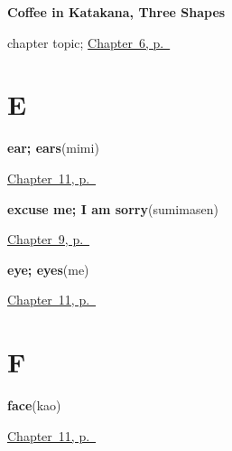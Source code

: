 \noindent\begin{minipage}[t]{\linewidth}
\raggedright
\textbf{Coffee in Katakana, Three Shapes}\par
\footnotesize chapter topic; \hyperref[ch:ja-koohii-katakana]{Chapter~6, p.~\pageref*{ch:ja-koohii-katakana}}
\end{minipage}\par\smallskip

\section*{E}

\noindent\begin{minipage}[t]{\linewidth}
\raggedright
\textbf{ear; ears}\enspace\emph{}\enspace(mimi)\par
\footnotesize \hyperref[ch:ja-body-seven]{Chapter~11, p.~\pageref*{ch:ja-body-seven}}
\end{minipage}\par\smallskip

\noindent\begin{minipage}[t]{\linewidth}
\raggedright
\textbf{excuse me; I am sorry}\enspace\emph{}\enspace(sumimasen)\par
\footnotesize \hyperref[ch:ja-repeat-please]{Chapter~9, p.~\pageref*{ch:ja-repeat-please}}
\end{minipage}\par\smallskip

\noindent\begin{minipage}[t]{\linewidth}
\raggedright
\textbf{eye; eyes}\enspace\emph{}\enspace(me)\par
\footnotesize \hyperref[ch:ja-body-seven]{Chapter~11, p.~\pageref*{ch:ja-body-seven}}
\end{minipage}\par\smallskip

\section*{F}

\noindent\begin{minipage}[t]{\linewidth}
\raggedright
\textbf{face}\enspace\emph{}\enspace(kao)\par
\footnotesize \hyperref[ch:ja-body-seven]{Chapter~11, p.~\pageref*{ch:ja-body-seven}}
\end{minipage}\par\smallskip

